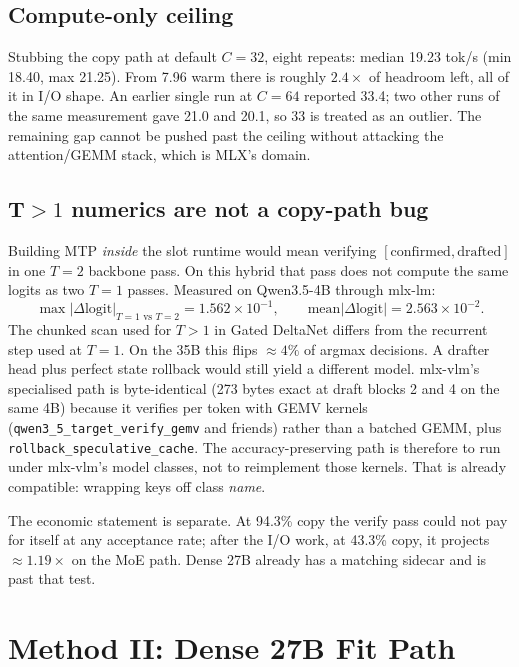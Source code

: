 \subsection{Compute-only ceiling}

Stubbing the copy path at default $C{=}32$, eight repeats: median 19.23 tok/s (min 18.40, max 21.25). From 7.96 warm there is roughly $2.4\times$ of headroom left, all of it in I/O shape. An earlier single run at $C{=}64$ reported 33.4; two other runs of the same measurement gave 21.0 and 20.1, so 33 is treated as an outlier. The remaining gap cannot be pushed past the ceiling without attacking the attention/GEMM stack, which is MLX's domain.

\subsection{\texorpdfstring{T${>}1$ numerics are not a copy-path bug}{T>1 numerics are not a copy-path bug}}

Building MTP \emph{inside} the slot runtime would mean verifying $[\mathrm{confirmed},\mathrm{drafted}]$ in one $T{=}2$ backbone pass. On this hybrid that pass does not compute the same logits as two $T{=}1$ passes. Measured on Qwen3.5-4B through mlx-lm:
\[
\max|\Delta\mathrm{logit}|_{T=1\text{ vs }T=2}=1.562\times 10^{-1},\qquad
\mathrm{mean}|\Delta\mathrm{logit}|=2.563\times 10^{-2}.
\]
The chunked scan used for $T{>}1$ in Gated DeltaNet differs from the recurrent step used at $T{=}1$. On the 35B this flips $\approx 4\%$ of argmax decisions. A drafter head plus perfect state rollback would still yield a different model. mlx-vlm's specialised path is byte-identical (273 bytes exact at draft blocks 2 and 4 on the same 4B) because it verifies per token with GEMV kernels (\texttt{qwen3\_5\_target\_verify\_gemv} and friends) rather than a batched GEMM, plus \texttt{rollback\_speculative\_cache}. The accuracy-preserving path is therefore to run under mlx-vlm's model classes, not to reimplement those kernels. That is already compatible: wrapping keys off class \emph{name}.

The economic statement is separate. At 94.3\% copy the verify pass could not pay for itself at any acceptance rate; after the I/O work, at 43.3\% copy, it projects $\approx 1.19\times$ on the MoE path. Dense 27B already has a matching sidecar and is past that test.

\section{Method II: Dense 27B Fit Path}
\label{sec:dense}

